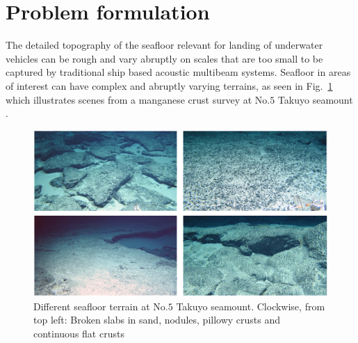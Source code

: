 \section{Problem formulation}

The detailed topography of the seafloor relevant for landing of underwater vehicles can be rough and vary abruptly on scales that are too small to be captured by traditional ship based acoustic multibeam systems. Seafloor in areas of interest can have complex and abruptly varying terrains, as seen in Fig.~\ref{f:mehul1} which illustrates scenes from a manganese crust survey at No.$5$ Takuyo seamount \cite{Thornton2013l}. 

\begin{figure}[!ht]
\centering
\includegraphics[width=5.5in]{./images/mehul1.png}
\caption{Different seafloor terrain at No.$5$ Takuyo seamount. Clockwise, from top left: Broken slabs in sand, nodules, pillowy crusts and continuous flat crusts}
\label{f:mehul1}
\end{figure}

